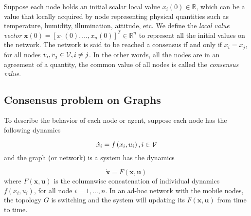 Suppose each node holds an initial scalar local value $x_{i}\left(0\right)\in\mathbb{R}$,
which can be a value that locally acquired by node representing physical
quantities such as temperature, humidity, illumination, attitude,
etc. We define the \textit{local value vector} $\mathbf{x}\left(0\right)=\left[x_{1}\left(0\right),...,x_{n}\left(0\right)\right]^{T}\in\mathbb{R}^{n}$
to represent all the initial values on the network. The network is
said to be reached a consensus if and only if $x_{i}=x_{j}$, for
all nodes $v_{i},v_{j}\in{\cal V},i\neq j$. In the other words, all
the nodes are in an agreement of a quantity, the common value of all
nodes is called the \textit{consensus value}.


\subsection{Consensus problem on Graphs}

To describe the behavior of each node or agent, suppose each node
has the following dynamics 

\begin{equation}
\dot{x}_{i}=f\left(x_{i},u_{i}\right),i\in{\cal V}
\end{equation}
and the graph (or network) is a system has the dynamics

\begin{equation}
\mathbf{\dot{x}}=F\left(\mathbf{x},\mathbf{u}\right)\label{eq:system dynamic}
\end{equation}
where $F\left(\mathbf{x},\mathbf{u}\right)$ is the columnwise concatenation
of individual dynamics $f\left(x_{i},u_{i}\right)$, for all node
$i=1,\ldots,n$. In an ad-hoc network with the mobile nodes, the topology
$G$\textbf{ }is switching and the system will updating its $F\left(\mathbf{x},\mathbf{u}\right)$
from time to time. 

